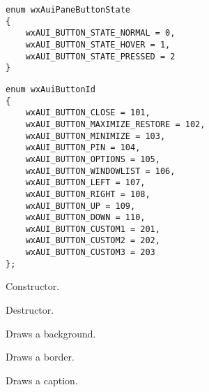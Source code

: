 \begin{verbatim}
enum wxAuiPaneButtonState
{
    wxAUI_BUTTON_STATE_NORMAL = 0,
    wxAUI_BUTTON_STATE_HOVER = 1,
    wxAUI_BUTTON_STATE_PRESSED = 2
}
\end{verbatim}

\begin{verbatim}
enum wxAuiButtonId
{
    wxAUI_BUTTON_CLOSE = 101,
    wxAUI_BUTTON_MAXIMIZE_RESTORE = 102,
    wxAUI_BUTTON_MINIMIZE = 103,
    wxAUI_BUTTON_PIN = 104,
    wxAUI_BUTTON_OPTIONS = 105,
    wxAUI_BUTTON_WINDOWLIST = 106,
    wxAUI_BUTTON_LEFT = 107,
    wxAUI_BUTTON_RIGHT = 108,
    wxAUI_BUTTON_UP = 109,
    wxAUI_BUTTON_DOWN = 110,
    wxAUI_BUTTON_CUSTOM1 = 201,
    wxAUI_BUTTON_CUSTOM2 = 202,
    wxAUI_BUTTON_CUSTOM3 = 203
};
\end{verbatim}



\label{wxauidockartwxauidockart}


Constructor.

\label{wxauidockartdtor}


Destructor.

\label{wxauidockartdrawbackground}


Draws a background.

\label{wxauidockartdrawborder}


Draws a border.

\label{wxauidockartdrawcaption}


Draws a caption.

\label{wxauidockartdrawgripper}

